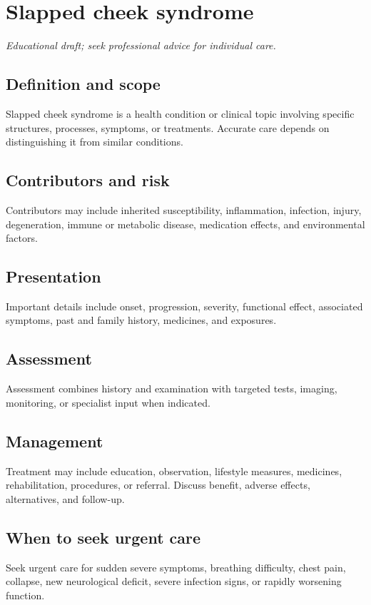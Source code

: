 \chapter{Slapped cheek syndrome}
\medskip
\noindent\textit{Educational draft; seek professional advice for individual care.}

\section*{Definition and scope}
Slapped cheek syndrome is a health condition or clinical topic involving specific structures, processes, symptoms, or treatments. Accurate care depends on distinguishing it from similar conditions.

\section*{Contributors and risk}
Contributors may include inherited susceptibility, inflammation, infection, injury, degeneration, immune or metabolic disease, medication effects, and environmental factors.

\section*{Presentation}
Important details include onset, progression, severity, functional effect, associated symptoms, past and family history, medicines, and exposures.

\section*{Assessment}
Assessment combines history and examination with targeted tests, imaging, monitoring, or specialist input when indicated.

\section*{Management}
Treatment may include education, observation, lifestyle measures, medicines, rehabilitation, procedures, or referral. Discuss benefit, adverse effects, alternatives, and follow-up.

\section*{When to seek urgent care}
Seek urgent care for sudden severe symptoms, breathing difficulty, chest pain, collapse, new neurological deficit, severe infection signs, or rapidly worsening function.

